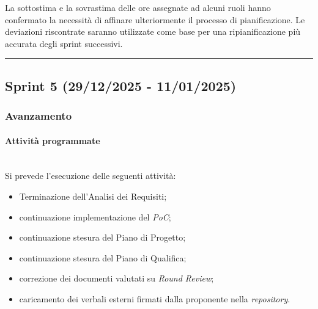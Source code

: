 \documentclass[10pt, letterpaper]{article}
\newcommand{\trisubsection}[1]{\paragraph{#1}\mbox{}\\}
\begin{document}
La sottostima e la sovrastima delle ore assegnate ad alcuni ruoli hanno confermato la necessità di affinare
ulteriormente il processo di pianificazione.
Le deviazioni riscontrate saranno utilizzate come base per una
ripianificazione più accurata degli sprint successivi.


\vspace{1em}
\hrule
\vspace{1em}

\subsection{Sprint 5 (29/12/2025 - 11/01/2025)}
\subsubsection{Avanzamento}
\trisubsection{Attività programmate}
Si prevede l'esecuzione delle seguenti attività:
\begin{itemize}
    \item Terminazione dell'Analisi dei Requisiti;
    \item continuazione implementazione del \textit{PoC};
    \item continuazione stesura del Piano di Progetto;
    \item continuazione stesura del Piano di Qualifica;
    \item correzione dei documenti valutati su \textit{Round Review};
    \item caricamento dei verbali esterni firmati dalla proponente nella \textit{repository}.
\end{itemize}
\end{document}
